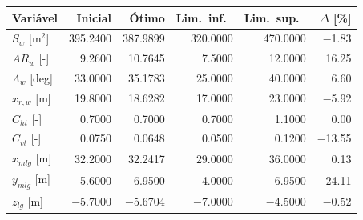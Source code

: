 \begin{tabular}{lrrrrr}
\toprule
Variável & Inicial & Ótimo & Lim.\ inf.\ & Lim.\ sup.\ & $\Delta$ [\%] \\
\midrule
$S_w$ [m$^2$] & 395.2400 & 387.9899 & 320.0000 & 470.0000 & $-$1.83 \\
$AR_w$ [-] & 9.2600 & 10.7645 & 7.5000 & 12.0000 & 16.25 \\
$\Lambda_w$ [deg] & 33.0000 & 35.1783 & 25.0000 & 40.0000 & 6.60 \\
$x_{r,w}$ [m] & 19.8000 & 18.6282 & 17.0000 & 23.0000 & $-$5.92 \\
$C_{ht}$ [-] & 0.7000 & 0.7000 & 0.7000 & 1.1000 & 0.00 \\
$C_{vt}$ [-] & 0.0750 & 0.0648 & 0.0500 & 0.1200 & $-$13.55 \\
$x_{mlg}$ [m] & 32.2000 & 32.2417 & 29.0000 & 36.0000 & 0.13 \\
$y_{mlg}$ [m] & 5.6000 & 6.9500 & 4.0000 & 6.9500 & 24.11 \\
$z_{lg}$ [m] & $-$5.7000 & $-$5.6704 & $-$7.0000 & $-$4.5000 & $-$0.52 \\
\bottomrule
\end{tabular}